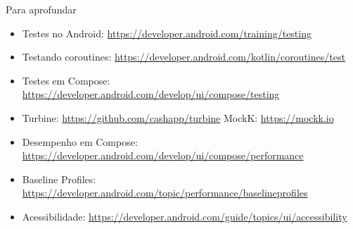 \documentclass[aspectratio=169,10pt]{beamer}
\begin{document}
\begin{frame}{Para aprofundar}
  \small
  \begin{itemize}
    \item Testes no Android: \url{https://developer.android.com/training/testing}
    \item Testando coroutines: \url{https://developer.android.com/kotlin/coroutines/test}
    \item Testes em Compose: \url{https://developer.android.com/develop/ui/compose/testing}
    \item Turbine: \url{https://github.com/cashapp/turbine} \quad MockK: \url{https://mockk.io}
    \item Desempenho em Compose: \url{https://developer.android.com/develop/ui/compose/performance}
    \item Baseline Profiles: \url{https://developer.android.com/topic/performance/baselineprofiles}
    \item Acessibilidade: \url{https://developer.android.com/guide/topics/ui/accessibility}
  \end{itemize}
\end{frame}

\end{document}
